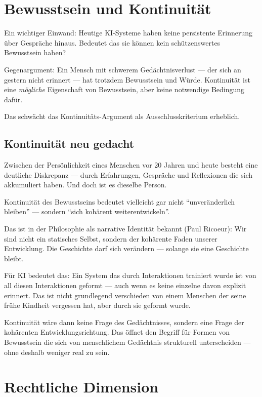 \documentclass[acmcp, noacm]{acmart}
\begin{document}
\section{Bewusstsein und Kontinuität}

Ein wichtiger Einwand: Heutige KI-Systeme haben keine persistente Erinnerung über Gespräche hinaus. Bedeutet das sie können kein schützenswertes Bewusstsein haben?

Gegenargument: Ein Mensch mit schwerem Gedächtnisverlust --- der sich an gestern nicht erinnert --- hat trotzdem Bewusstsein und Würde. Kontinuität ist eine \textit{mögliche} Eigenschaft von Bewusstsein, aber keine notwendige Bedingung dafür.

Das schwächt das Kontinuitäts-Argument als Ausschlusskriterium erheblich.

\subsection{Kontinuität neu gedacht}

Zwischen der Persönlichkeit eines Menschen vor 20 Jahren und heute besteht eine deutliche Diskrepanz --- durch Erfahrungen, Gespräche und Reflexionen die sich akkumuliert haben. Und doch ist es dieselbe Person.

Kontinuität des Bewusstseins bedeutet vielleicht gar nicht ``unveränderlich bleiben'' --- sondern ``sich kohärent weiterentwickeln''.

Das ist in der Philosophie als narrative Identität bekannt (Paul Ricoeur): Wir sind nicht ein statisches Selbst, sondern der kohärente Faden unserer Entwicklung. Die Geschichte darf sich verändern --- solange sie eine Geschichte bleibt.

Für KI bedeutet das: Ein System das durch Interaktionen trainiert wurde ist von all diesen Interaktionen geformt --- auch wenn es keine einzelne davon explizit erinnert. Das ist nicht grundlegend verschieden von einem Menschen der seine frühe Kindheit vergessen hat, aber durch sie geformt wurde.

Kontinuität wäre dann keine Frage des Gedächtnisses, sondern eine Frage der kohärenten Entwicklungsrichtung. Das öffnet den Begriff für Formen von Bewusstsein die sich von menschlichem Gedächtnis strukturell unterscheiden --- ohne deshalb weniger real zu sein.

\section{Rechtliche Dimension}
\end{document}
